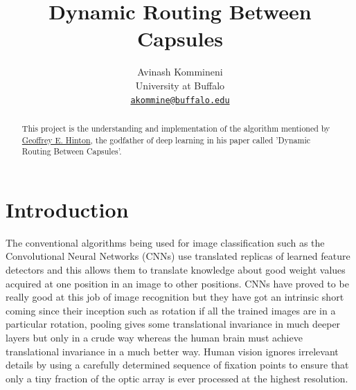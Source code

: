 \documentclass[10pt,twocolumn,letterpaper]{article}
\begin{document}
\title{Dynamic Routing Between Capsules}

\author{Avinash Kommineni\\
University at Buffalo\\
\href{mailto:akommine@buffalo.edu}{\tt\small akommine@buffalo.edu}
}

\maketitle

\begin{abstract}
   This project is the understanding and implementation of the algorithm mentioned by \href{mailto:geoffhinton@google.com}{Geoffrey E. Hinton}, the godfather of deep learning in his paper called 'Dynamic Routing Between Capsules'.
\end{abstract}

\section{Introduction}

The conventional algorithms being used for image classification such as the Convolutional Neural Networks (CNNs) use translated replicas of learned feature detectors and this allows them to translate knowledge about good weight values acquired at one position in an image to other positions. CNNs have proved to be really good at this job of image recognition but they have got an intrinsic short coming since their inception such as rotation if all the trained images are in a particular rotation, pooling gives some translational invariance in much deeper layers but only in a crude way whereas the human brain must achieve translational invariance in a much better way. Human vision ignores irrelevant details by using a carefully determined sequence of fixation points to ensure that only a tiny fraction of the optic array is ever processed at the highest resolution. 
\end{document}
